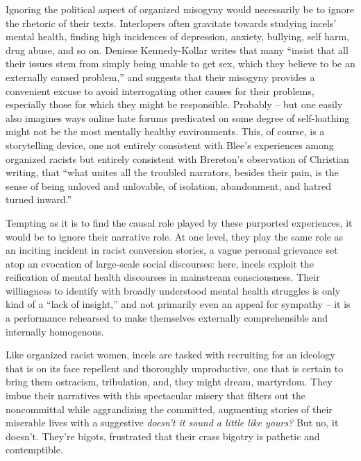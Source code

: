 \documentclass[11pt]{article}
\begin{document}
Ignoring the political aspect of organized misogyny would necessarily be to ignore the rhetoric of their texts. Interlopers often gravitate towards studying incels' mental health, finding high incidences of depression, anxiety, bullying, self harm, drug abuse, and so on. Deniese Kennedy-Kollar writes that many ``insist that all their issues stem from simply being unable to get sex, which they believe to be an externally caused problem,'' and suggests that their misogyny provides a convenient excuse to avoid interrogating other causes for their problems, especially those for which they might be responsible.\autocite[70]{Ke24} Probably -- but one easily also imagines ways online hate forums predicated on some degree of self-loathing might not be the most mentally healthy environments. This, of course, is a storytelling device, one not entirely consistent with Blee's experiences among organized racists but entirely consistent with Brereton's observation of Christian writing, that ``what unites all the troubled narrators, besides their pain, is the sense of being unloved and unlovable, of isolation, abandonment, and hatred turned inward.''\autocite[51]{Br91}

Tempting as it is to find the causal role played by these purported experiences, it would be to ignore their narrative role. At one level, they play the same role as an inciting incident in racist conversion stories, a vague personal grievance set atop an evocation of large-scale social discourses: here, incels exploit the reification of mental health discourses in mainstream consciousness. Their willingness to identify with broadly understood mental health struggles is only kind of a ``lack of insight,'' and not primarily even an appeal for sympathy -- it is a performance rehearsed to make themselves externally comprehensible and internally homogenous. 

Like organized racist women, incels are tasked with recruiting for an ideology that is on its face repellent and thoroughly unproductive, one that is certain to bring them ostracism, tribulation, and, they might dream, martyrdom. They imbue their narratives with this spectacular misery that filters out the noncommittal while aggrandizing the committed, augmenting stories of their miserable lives with a suggestive \textit{doesn't it sound a little like yours?} But no, it doesn't. They're bigots, frustrated that their crass bigotry is pathetic and contemptible.

\printbibliography
\end{document}
